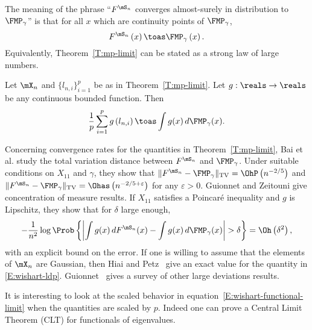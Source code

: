 The meaning of the phrase ``$F^{\mS_n}$ converges almost-surely in distribution to $\FMP_\gamma$'' is that for all $x$ which are continuity points of $\FMP_\gamma$,
\begin{equation}\label{E:spectral-measure-limit-point}
    F^{\mS_n} \left(
        x
    \right)
    \toas
    \FMP_\gamma \left(
        x
    \right).
\end{equation}
Equivalently, Theorem~\ref{T:mp-limit} can be stated as a strong law of large numbers.

\begin{corollary}\label{C:wishart-lln}
    Let $\mX_n$ and $\{ l_{n,i} \}_{i=1}^{p}$ be as in 
    Theorem~\ref{T:mp-limit}.  Let $g : \reals \to \reals$ be any
    continuous bounded function.  Then
    \begin{equation}\label{E:wishart-functional-limit}
        \frac{1}{p}
        \sum_{i=1}^p
            g \left( l_{n,i} \right)
        \toas
        \int
            g(x)
            \,
            d\FMP_\gamma ( x ).
    \end{equation}
\end{corollary}

Concerning convergence rates for the quantities in Theorem~\ref{T:mp-limit},  Bai et al. \cite{bai2003crs} study the total variation distance between $F^{\mS_n}$ and $\FMP_\gamma$.  Under suitable conditions on $X_{11}$ and $\gamma$, they show that
\(
    \| F^{\mS_n} - \FMP_\gamma \|_\text{TV}
    =
    \OhP\left( n^{-2/5} \right)
\)
and
\(
    \| F^{\mS_n} - \FMP_\gamma \|_\text{TV}
    =
    \Ohas\left( n^{-2/5 + \varepsilon} \right)
\)
for any $\varepsilon > 0$.
Guionnet and Zeitouni \cite{guionnet2000csm} give concentration of measure results.  If $X_{11}$ satisfies a Poincar\'e inequality and $g$ is Lipschitz, they show that for $\delta$ large enough,
\begin{equation}\label{E:wishart-ldp}
    -
    \frac{1}{n^2}
    \log \Prob\left\{ 
        \left|
            \int g(x) \, dF^{\mS_n}(x) - \int g(x) \, d\FMP_\gamma(x)
        \right|
        >
        \delta
    \right\}
    =
    \Oh\left(
        \delta^2
    \right),
\end{equation}
with an explicit bound on the error. If one is willing to assume that the elements of $\mX_n$ are Gaussian, then Hiai and Petz~\cite{hiai1998edw} give an exact value for the quantity in \eqref{E:wishart-ldp}.  Guionnet~\cite{guionnetlds} gives a survey of other large deviations results.  

It is interesting to look at the scaled behavior in equation~\eqref{E:wishart-functional-limit} when the quantities are scaled by $p$.  Indeed one can prove a Central Limit Theorem (CLT) for functionals of eigenvalues.

